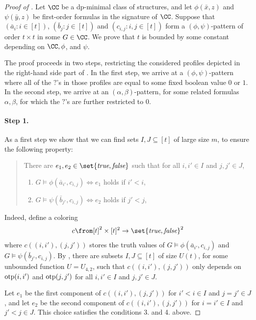 \begin{proof}[Proof of ]
    Let $\CC$ be a dp-minimal class of structures, and let $\phi(\bar x,z)$ and $\psi(\bar y,z)$ be first-order formulas in the signature of $\CC$.
Suppose that
$(\bar a_i:i\in [t])$,
$(\bar b_j:j\in [t])$ and $(c_{i,j}:i,j\in[t])$ form a $(\phi,\psi)$-pattern of order $t\times t$ in some $G\in\CC$. We prove that $t$ is bounded by some constant depending on $\CC,\phi$, and $\psi$.

The proof proceeds in two steps, restricting the considered profiles depicted in the right-hand side part of .
In the first step, we arrive at a $(\phi,\psi)$-pattern where all of the $?$'s in those profiles are equal to some fixed boolean value $0$ or $1$. In the second step, we
arrive at an $(\alpha,\beta)$-pattern, for some related formulas $\alpha,\beta$,
for which the $?$'s are further restricted to $0$.

\paragraph{Step 1.}
As a first step we show that
we can find sets $I,J\subseteq [t]$ of large size $m$, to ensure the following property:

\begin{quote}
There are $e_1,e_2\in\set{\textit{true},\textit{false}}$
 such that for all $i,i'\in I$ and $j,j'\in J$,

\begin{enumerate}[start=3]
    \item $G\models\phi(\bar a_{i'},c_{i,j})\Leftrightarrow e_1$ holds if $i'<i$,
    \item $G\models\psi(\bar b_{j'},c_{i,j})\Leftrightarrow e_2$ holds if $j'<j$,
\end{enumerate}
\end{quote}

\noindent Indeed,
define a coloring
$$c\from [t]^2\times [t]^2\to \set{\textit{true},\textit{false}}^2$$
where $c((i,i'),(j,j'))$
stores the truth values of
$G\models\phi(\bar a_{i'},c_{i,j})$
and
$G\models\psi(\bar b_{j'},c_{i,j})$.
By , there are subsets $I,J\subseteq [t]$
of size $U(t)$, for some unbounded function $U=U_{4,2}$,
such that
$c((i,i'),(j,j'))$ only depends on $\mathrm{otp}(i,i')$ and $\mathrm{otp}(j,j')$
for all $i,i'\in I$ and $j,j'\in J$.

Let $e_1$ be the first component of $c((i,i'),(j,j'))$ for  $i'<i\in I$ and $j=j'\in J$,
and let $e_2$ be the second component of $c((i,i'),(j,j'))$
for $i=i'\in I$ and $j'<j\in J$. This choice satisfies the conditions 3. and 4. above.


\end{proof}
